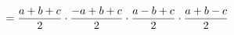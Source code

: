 \documentclass[preview]{standalone}
\begin{document}
\begin{align*}
\special{dvisvgm:raw <g id='unique000'>}= \frac{a+b+c}{2}\cdot\frac{-a+b+c}{2}\cdot\frac{a-b+c}{2}\cdot\frac{a+b-c}{2}\special{dvisvgm:raw </g>}
\end{align*}
\end{document}
